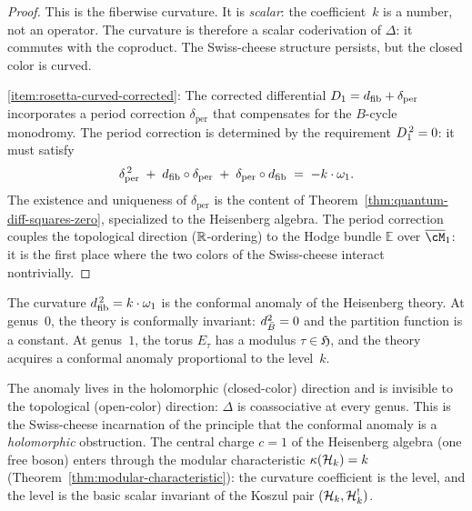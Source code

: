 \begin{proof}
This is the fiberwise curvature.  It is \emph{scalar}: the
coefficient~$k$ is a number, not an operator.  The curvature
is therefore a scalar coderivation of $\Delta$: it commutes
with the coproduct.  The Swiss-cheese structure persists, but
the closed color is curved.

\medskip
\ref{item:rosetta-curved-corrected}:
The corrected differential $D_{1} = d_{\mathrm{fib}} + \delta_{\mathrm{per}}$
incorporates a period correction $\delta_{\mathrm{per}}$ that
compensates for the $B$-cycle monodromy.  The period correction
is determined by the requirement $D_{1}^{\,2} = 0$: it must
satisfy
\begin{equation}\label{eq:rosetta-period-correction}
\delta_{\mathrm{per}}^{\,2}
\;+\;
d_{\mathrm{fib}} \circ \delta_{\mathrm{per}}
\;+\;
\delta_{\mathrm{per}} \circ d_{\mathrm{fib}}
\;=\;
-k \cdot \omega_1.
\end{equation}
The existence and uniqueness of $\delta_{\mathrm{per}}$ is the
content of Theorem~\ref{thm:quantum-diff-squares-zero},
specialized to the Heisenberg algebra.  The period correction
couples the topological direction ($\mathbb{R}$-ordering) to the Hodge
bundle $\mathbb{E}$ over $\overline{\cM}_1$: it is the
first place where the two colors of the Swiss-cheese
interact nontrivially.
\end{proof}

\begin{remark}
\label{rem:rosetta-curvature-physics}
The curvature $d_{\mathrm{fib}}^{\,2} = k \cdot \omega_1$ is the conformal
anomaly of the Heisenberg theory.  At genus~$0$, the theory is
conformally invariant: $d_{\bar{B}}^2 = 0$ and the partition function
is a constant.  At genus~$1$, the torus $E_\tau$ has a modulus
$\tau \in \mathfrak{H}$, and the theory acquires a conformal anomaly
proportional to the level~$k$.

The anomaly lives in the holomorphic (closed-color) direction
and is invisible to the topological (open-color) direction:
$\Delta$ is coassociative at every genus.  This is the
Swiss-cheese incarnation of the principle that the conformal
anomaly is a \emph{holomorphic} obstruction.  The central
charge $c = 1$ of the Heisenberg algebra (one free boson)
enters through the modular characteristic $\kappa(\mathcal{H}_k) = k$
(Theorem~\ref{thm:modular-characteristic}): the curvature
coefficient is the level, and the level is the basic scalar
invariant of the Koszul pair $(\mathcal{H}_k, \mathcal{H}_k^!)$.
\end{remark}

